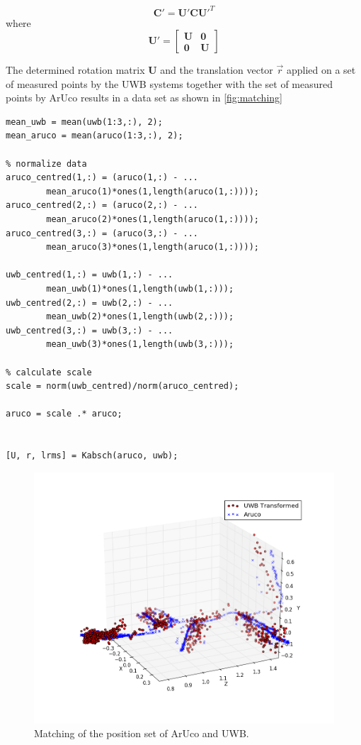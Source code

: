 \begin{equation}
	\textbf{C}' = \textbf{U}' \textbf{C} \textbf{U}'^T
\end{equation}
where
\begin{equation}
	\textbf{U}' =
	\begin{bmatrix}
		\textbf{U} & \textbf{0} \\
		\textbf{0} & \textbf{U}
	\end{bmatrix}
\end{equation}

The determined rotation matrix $\textbf{U}$ and the translation vector $\vec r$ applied on a set of measured points by the UWB systems together with the set of measured points by ArUco results in a data set as shown in \autoref{fig:matching}

\lstset{language=Matlab}
\begin{lstlisting}[frame=single, caption=Matching proceeder, label=lst:matching]
% Calculate mean
mean_uwb = mean(uwb(1:3,:), 2);
mean_aruco = mean(aruco(1:3,:), 2);
	
% normalize data	
aruco_centred(1,:) = (aruco(1,:) - ...
		mean_aruco(1)*ones(1,length(aruco(1,:))));
aruco_centred(2,:) = (aruco(2,:) - ...
		mean_aruco(2)*ones(1,length(aruco(1,:))));
aruco_centred(3,:) = (aruco(3,:) - ...
		mean_aruco(3)*ones(1,length(aruco(1,:))));

uwb_centred(1,:) = uwb(1,:) - ...
		mean_uwb(1)*ones(1,length(uwb(1,:)));
uwb_centred(2,:) = uwb(2,:) - ...
		mean_uwb(2)*ones(1,length(uwb(2,:)));
uwb_centred(3,:) = uwb(3,:) - ...
		mean_uwb(3)*ones(1,length(uwb(3,:)));
	
% calculate scale
scale = norm(uwb_centred)/norm(aruco_centred);
	
aruco = scale .* aruco;
	
	
[U, r, lrms] = Kabsch(aruco, uwb);
\end{lstlisting}



\begin{figure}[ht!]\centering
	\includegraphics[width=1.0\textwidth]{figures/matching}
	\caption{Matching of the position set of ArUco and UWB.}\label{fig:matching}
\end{figure} 

